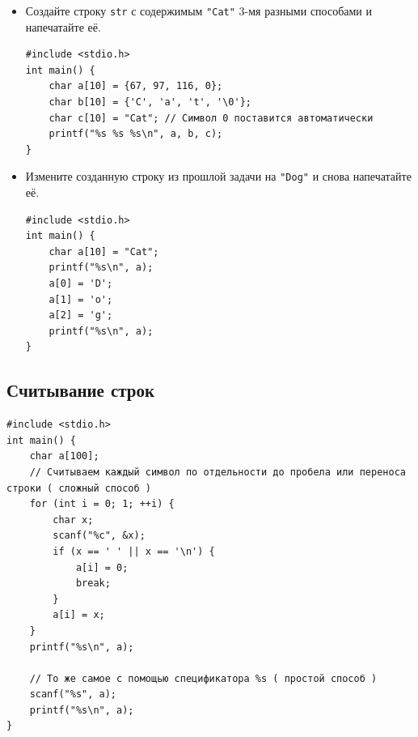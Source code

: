 \documentclass{article}
\begin{document}
\begin{itemize}
\item Создайте строку \texttt{str} с содержимым \texttt{"Cat"} 3-мя разными способами и напечатайте её.

\begin{lstlisting}[backgroundcolor = \color{solcolor}]
#include <stdio.h>
int main() {
    char a[10] = {67, 97, 116, 0};
    char b[10] = {'C', 'a', 't', '\0'};
    char c[10] = "Cat"; // Символ 0 поставится автоматически
	printf("%s %s %s\n", a, b, c);
}
\end{lstlisting}
\item Измените созданную строку из прошлой задачи на \texttt{"Dog"} и снова напечатайте её.
\begin{lstlisting}[backgroundcolor = \color{solcolor}]
#include <stdio.h>
int main() {
    char a[10] = "Cat";
    printf("%s\n", a);
    a[0] = 'D';
    a[1] = 'o';
    a[2] = 'g';
    printf("%s\n", a);
}
\end{lstlisting}
\end{itemize}


\subsection*{Считывание строк}
\begin{lstlisting}
#include <stdio.h>
int main() {
    char a[100];
    // Считываем каждый символ по отдельности до пробела или переноса строки ( сложный способ )
    for (int i = 0; 1; ++i) {
        char x;
        scanf("%c", &x);
        if (x == ' ' || x == '\n') {
            a[i] = 0;
            break;
        }
        a[i] = x;
    }
    printf("%s\n", a);
    
    // То же самое с помощью спецификатора %s ( простой способ )
    scanf("%s", a);
    printf("%s\n", a);
}
\end{lstlisting}
\end{document}
